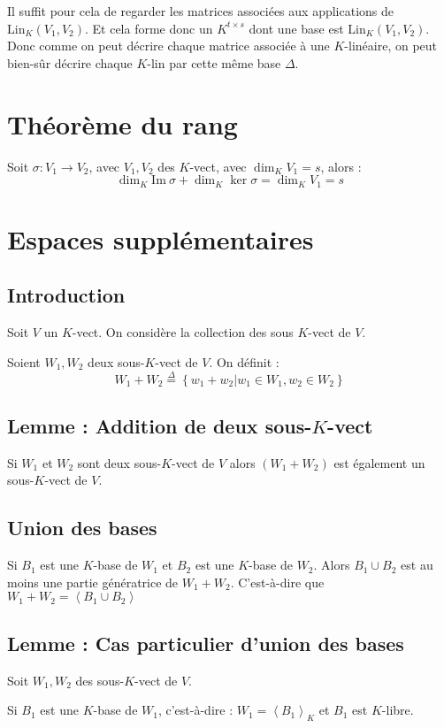 \documentclass[a4paper,10pt]{article}
\newcommand{\ap}{ \rightarrow} %
\newcommand{\grp}[1]{\left\langle #1 \right\rangle} %
\newcommand{\set}[1]{\left\lbrace #1 \right\rbrace } %
\newcommand{\im}{\mathrm{Im}\:} %
\begin{document}
    Il suffit pour cela de regarder les matrices associées aux applications de $\mathrm{Lin}_K (V_1,V_2)$. Et cela forme donc un $K^{t \times s}$ dont une base est $\mathrm{Lin}_K (V_1,V_2)$. Donc comme on peut décrire chaque matrice associée à une $K$-linéaire, on peut bien-sûr décrire chaque $K$-lin par cette même base $\Delta$.

 \section{Théorème du rang}
  Soit $\sigma : V_1 \ap V_2$, avec $V_1, V_2$ des $K$-vect, avec $\dim_K V_1 = s$, alors :
  $$\dim_K \im \sigma + \dim_K \ker \sigma = \dim_K V_1 = s$$

 \section{Espaces supplémentaires}
  \subsection{Introduction}
   Soit $V$ un $K$-vect. On considère la collection des sous $K$-vect de $V$.

   Soient $W_1, W_2$ deux sous-$K$-vect de $V$. On définit :
   $$W_1+W_2 \overset{\Delta}{=} \set{w_1 + w_2 | w_1 \in W_1, w_2 \in W_2}$$

  \subsection{Lemme : Addition de deux sous-$K$-vect}
   Si $W_1$ et $W_2$ sont deux sous-$K$-vect de $V$ alors $(W_1+W_2)$ est également un sous-$K$-vect de $V$.

  \subsection{Union des bases}
   Si $B_1$ est une $K$-base de $W_1$ et $B_2$ est une $K$-base de $W_2$. Alors $B_1 \cup B_2$ est au moins une partie génératrice de $W_1+W_2$. C'est-à-dire que $W_1+W_2 = \grp{B_1 \cup B_2}$

  \subsection{Lemme : Cas particulier d'union des bases}
   Soit $W_1, W_2$ des sous-$K$-vect de $V$.

   Si $B_1$ est une $K$-base de $W_1$, c'est-à-dire : $W_1 = \grp{B_1}_K$ et $B_1$ est $K$-libre.
\end{document}
